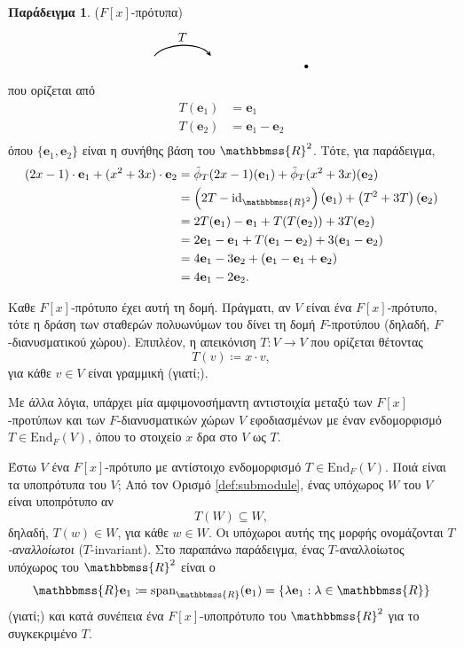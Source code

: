 \documentclass[12pt,a4paper,reqno]{amsart}
\theoremstyle{definition}
\newtheorem{example}[theorem]{Παράδειγμα}
\theoremstyle{remark}
\numberwithin{theorem}{section}
\numberwithin{exercise}{section}
\numberwithin{equation}{section}
\newcommand{\RR}{\mathbbmss{R}}
\newcommand{\bfe}{\mathbf{e}}
\renewcommand{\to}{\rightarrow}
\newcommand{\tl}{\tilde}
\newcommand{\End}{\mathrm{End}}
\newcommand{\rmid}{\mathrm{id}}
\newcommand{\rmspan}{\mathrm{span}}
\begin{document}
\begin{example}{\rm($F[x]$-πρότυπα)}
\[\begin{tikzpicture}[>=stealth, thick, scale=1]
\begin{scope}[shift={(6,0)}]
        \fill (0,0) circle (1.5pt);
    \end{scope}

    \draw[->, thick]
    (1.7,0.3) .. controls (2,0.7) and (3,0.7) .. (3.3,0.3)
    node[midway, above] {$T$};
\end{tikzpicture}
\]
που ορίζεται από 
\begin{align*}
    T(\bfe_1) &= \bfe_1 \\
    T(\bfe_2) &= \bfe_1-\bfe_2 \\
\end{align*}
όπου $\{\bfe_1, \bfe_2\}$ είναι η συνήθης βάση του $\RR^2$. Τότε, για παράδειγμα,  
\begin{align*}
    (2x-1)\cdot\bfe_1 + (x^2+3x)\cdot\bfe_2 
    &= \tl{\phi}_T(2x-1)(\bfe_1) + \tl{\phi}_T(x^2+3x)(\bfe_2) \\ 
    &=\left(2T-\rmid_{\RR^2}\right)(\bfe_1) + 
    \left(
        T^2 + 3T
    \right)(\bfe_2) \\
    &= 2T(\bfe_1) - \bfe_1 + T(T(\bfe_2)) + 3T(\bfe_2) \\
    &= 2\bfe_1 - \bfe_1 + T(\bfe_1-\bfe_2) + 3(\bfe_1-\bfe_2) \\
    &= 4\bfe_1 - 3\bfe_2 +(\bfe_1 -\bfe_1 + \bfe_2) \\ 
    &= 4\bfe_1 -2\bfe_2.
\end{align*}

Καθε $F[x]$-πρότυπο έχει αυτή τη δομή. Πράγματι, αν $V$ είναι ένα $F[x]$-πρότυπο, τότε η δράση των σταθερών πολυωνύμων του δίνει τη δομή $F$-προτύπου (δηλαδή, $F$-διανυσματικού χώρου). Επιπλέον, η απεικόνιση $T: V \to V$ που ορίζεται θέτοντας 
\[
T(v) \coloneqq x\cdot{v},
\]
για κάθε $v \in V$ είναι γραμμική (γιατί;). 

Με άλλα λόγια, υπάρχει μία αμφιμονοσήμαντη αντιστοιχία μεταξύ των $F[x]$-προτύπων και των $F$-διανυσματικών χώρων $V$ εφοδιασμένων με έναν ενδομορφισμό $T \in \End_F(V)$, όπου το στοιχείο $x$ δρα στο $V$ ως $T$.

Έστω $V$ ένα $F[x]$-πρότυπο με αντίστοιχο ενδομορφισμό $T \in \End_F(V)$. Ποιά είναι τα υποπρότυπα του $V$; Από τον Ορισμό \ref{def:submodule}, ένας υπόχωρος $W$ του $V$ είναι υποπρότυπο αν 
\[
T(W) \subseteq W,
\]
δηλαδή, $T(w) \in W$, για κάθε $w \in W$. Οι υπόχωροι αυτής της μορφής ονομάζονται \emph{$T$-αναλλοίωτοι} ($T$-invariant). Στο παραπάνω παράδειγμα, ένας $T$-αναλλοίωτος υπόχωρος του $\RR^2$ είναι ο 
\[
\RR\bfe_1 \coloneqq \rmspan_\RR(\bfe_1) = \{\lambda\bfe_1 : \lambda \in \RR\}
\]
(γιατί;) και κατά συνέπεια ένα $F[x]$-υποπρότυπο του $\RR^2$ για το συγκεκριμένο $T$.
\end{example}
\end{document}
